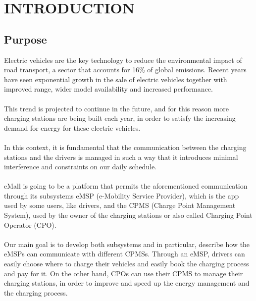\newcommand\row{\stepcounter{row}\arabic{row}}
\chapter{INTRODUCTION}
\label{ch:introduction}%

\section{Purpose}
Electric vehicles are the key technology to reduce the environmental impact of road transport, a sector that accounts for 16\% of global emissions. Recent years have seen exponential growth in the sale of electric vehicles together with improved range, wider model availability and increased performance. \\ \\
This trend is projected to continue in the future, and for this reason more charging stations are being built each year, in order to satisfy the increasing demand for energy for these electric vehicles. \\ \\
In this context, it is fundamental that the communication between the charging stations and the drivers is managed in such a way that it introduces minimal interference and constraints on 
our daily schedule. \\ \\
eMall is going to be a platform that permits the aforementioned communication through its subsystems eMSP (e-Mobility Service Provider), which is the app used by some users, like drivers, and the CPMS (Charge Point Management System), used by the owner of the charging stations or also called Charging Point Operator (CPO). \\ \\
Our main goal is to develop both subsystems and in particular, describe how the eMSPs can communicate with different CPMSs. Through an eMSP, drivers can easily choose where to charge their vehicles and easily book the charging process and pay for it. On the other hand, CPOs can use their CPMS to manage their charging stations, in order to improve and speed up the energy management and the charging process.
\label{sec:purpose}
